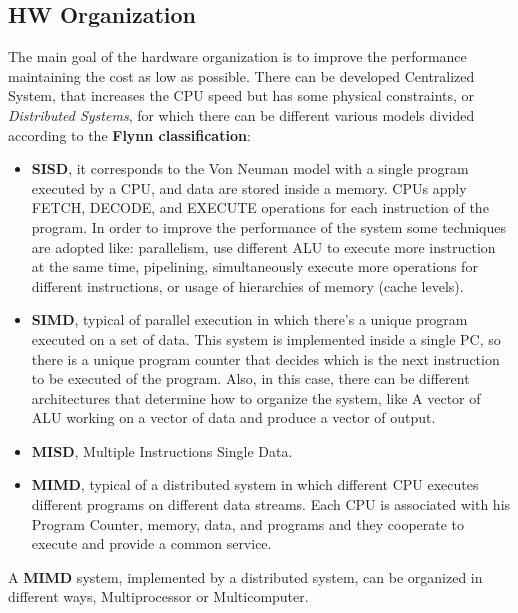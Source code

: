 \subsection{HW Organization}
The main goal of the hardware organization is to improve the performance maintaining the cost as low as possible. There can be developed Centralized System, that increases the CPU speed but has some physical constraints, or \textit{Distributed Systems}, for which there can be different various models divided according to the \textbf{Flynn classification}:
\begin{itemize}
    \item \textbf{SISD}, it corresponds to the Von Neuman model with a single program executed by a CPU, and data are stored inside a memory. CPUs apply FETCH, DECODE, and EXECUTE operations for each instruction of the program. In order to improve the performance of the system some techniques are adopted like: parallelism, use different ALU to execute more instruction at the same time, pipelining, simultaneously execute more operations for different instructions, or usage of hierarchies of memory (cache levels).
    \item \textbf{SIMD}, typical of parallel execution in which there's a unique program executed on a set of data. This system is implemented inside a single PC, so there is a unique program counter that decides which is the next instruction to be executed of the program. Also, in this case, there can be different architectures that determine how to organize the system, like A vector of ALU working on a vector of data and produce a vector of output.
    \item \textbf{MISD}, Multiple Instructions Single Data.
    \item \textbf{MIMD}, typical of a distributed system in which different CPU executes different programs on different data streams. Each CPU is associated with his Program Counter, memory, data, and programs and they cooperate to execute and provide a common service.
\end{itemize}

A \textbf{MIMD} system, implemented by a distributed system, can be organized in different ways, Multiprocessor or Multicomputer.

